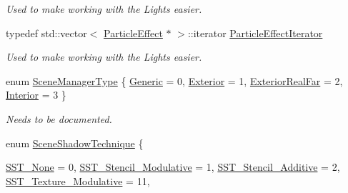 \begin{DoxyCompactItemize}
\begin{DoxyCompactList}\small\item\em Used to make working with the Lights easier. \item\end{DoxyCompactList}\item 
\hypertarget{classphys_1_1SceneManager_a668ef8db2053cc15cc48b21fa6240c3e}{
typedef std::vector$<$ \hyperlink{classphys_1_1ParticleEffect}{ParticleEffect} $\ast$ $>$::iterator \hyperlink{classphys_1_1SceneManager_a668ef8db2053cc15cc48b21fa6240c3e}{ParticleEffectIterator}}
\label{classphys_1_1SceneManager_a668ef8db2053cc15cc48b21fa6240c3e}

\begin{DoxyCompactList}\small\item\em Used to make working with the Lights easier. \item\end{DoxyCompactList}\item 
enum \hyperlink{classphys_1_1SceneManager_a14fe15dcf41564fdf12f3e11c1a4b774}{SceneManagerType} \{ \hyperlink{classphys_1_1SceneManager_a14fe15dcf41564fdf12f3e11c1a4b774ae556c6d77cbc80f7fddb859d1bde7738}{Generic} =  0, 
\hyperlink{classphys_1_1SceneManager_a14fe15dcf41564fdf12f3e11c1a4b774a76452baaacf89eac4d34596826d19ca7}{Exterior} =  1, 
\hyperlink{classphys_1_1SceneManager_a14fe15dcf41564fdf12f3e11c1a4b774a483ff734e11e4f63eb81569b2ade26e1}{ExteriorRealFar} =  2, 
\hyperlink{classphys_1_1SceneManager_a14fe15dcf41564fdf12f3e11c1a4b774ab582df9aaf3ba748a7dd4c6f5bd7250d}{Interior} =  3
 \}
\begin{DoxyCompactList}\small\item\em Needs to be documented. \item\end{DoxyCompactList}\item 
enum \hyperlink{classphys_1_1SceneManager_a427f1bbb52c11ad07352ae01d8b3c746}{SceneShadowTechnique} \{ \par
\hyperlink{classphys_1_1SceneManager_a427f1bbb52c11ad07352ae01d8b3c746ad96e23ac363ae9de73e2d3816ae66f2e}{SST\_\-None} =  0, 
\hyperlink{classphys_1_1SceneManager_a427f1bbb52c11ad07352ae01d8b3c746a9b11aebab7ffc5ff359f5a49b4ff5e7d}{SST\_\-Stencil\_\-Modulative} =  1, 
\hyperlink{classphys_1_1SceneManager_a427f1bbb52c11ad07352ae01d8b3c746a17ba96aa6b125ac6c787851815370d97}{SST\_\-Stencil\_\-Additive} =  2, 
\hyperlink{classphys_1_1SceneManager_a427f1bbb52c11ad07352ae01d8b3c746a6ce2d2624df59f6c2fb6f3cb07d3adf8}{SST\_\-Texture\_\-Modulative} =  11, 
\par

\end{DoxyCompactItemize}
